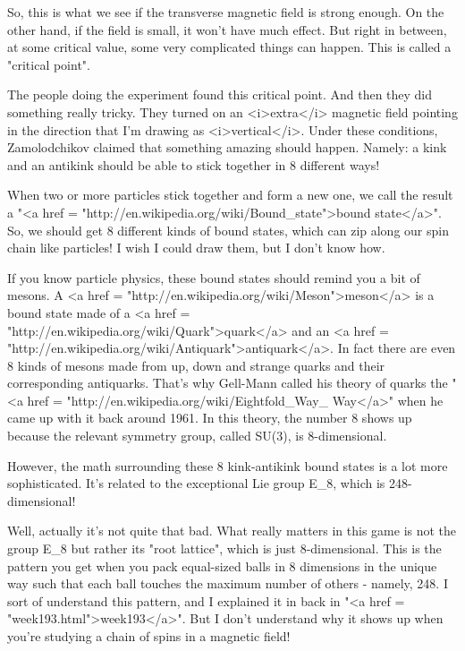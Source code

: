 So, this is what we see if the transverse magnetic field is strong
enough.  On the other hand, if the field is small, it won't have much
effect.  But right in between, at some critical value, some very
complicated things can happen.  This is called a "critical point".

The people doing the experiment found this critical point.  And then
they did something really tricky.  They turned on an <i>extra</i>
magnetic field pointing in the direction that I'm drawing as
<i>vertical</i>.  Under these conditions, Zamolodchikov claimed that
something amazing should happen.  Namely: a kink and an antikink
should be able to stick together in 8 different ways!

When two or more particles stick together and form a new one, we call
the result a "<a href =
"http://en.wikipedia.org/wiki/Bound_state">bound state</a>".  So,
we should get 8 different kinds of bound states, which can zip along
our spin chain like particles!  I wish I could draw them, but I don't
know how.

If you know particle physics, these bound states should remind you a
bit of mesons.  A <a href =
"http://en.wikipedia.org/wiki/Meson">meson</a> is a bound state made
of a <a href = "http://en.wikipedia.org/wiki/Quark">quark</a> and an
<a href = "http://en.wikipedia.org/wiki/Antiquark">antiquark</a>.  In
fact there are even 8 kinds of mesons made from up, down and strange
quarks and their corresponding antiquarks.  That's why Gell-Mann
called his theory of quarks the "<a href =
"http://en.wikipedia.org/wiki/Eightfold_Way_%
Way</a>" when he came up with it back around 1961.  In this
theory, the number 8 shows up because the relevant symmetry group,
called SU(3), is 8-dimensional.

However, the math surrounding these 8 kink-antikink bound states is a
lot more sophisticated.  It's related to the exceptional Lie group
E_{8}, which is 248-dimensional!

Well, actually it's not quite that bad.  What really matters in this
game is not the group E_{8} but rather its "root
lattice", which is just 8-dimensional.  This is the pattern you
get when you pack equal-sized balls in 8 dimensions in the unique way
such that each ball touches the maximum number of others - namely,
248.  I sort of understand this pattern, and I explained it in back in
"<a href = "week193.html">week193</a>".  But I don't understand
why it shows up when you're studying a chain of spins in a magnetic
field!

